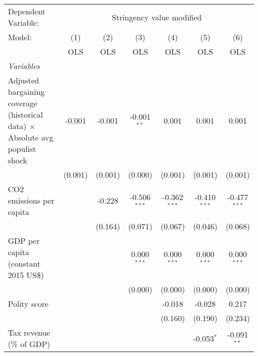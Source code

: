 
\begingroup
\centering
\begin{tabular}{lcccccc}
   \toprule
   Dependent Variable: & \multicolumn{6}{c}{Stringency value modified}\\
   Model:                                                                               & (1)     & (2)     & (3)            & (4)            & (5)            & (6)\\  
                                                                                        &  OLS    & OLS     & OLS            & OLS            & OLS            & OLS\\  
   \midrule
   \emph{Variables}\\
   Adjusted bargaining coverage (historical data) $\times$ Absolute avg populist shock  & -0.001  & -0.001  & -0.001$^{**}$  & 0.001          & 0.001          & 0.001\\   
                                                                                        & (0.001) & (0.001) & (0.000)        & (0.001)        & (0.001)        & (0.001)\\   
   CO2 emissions per capita                                                             &         & -0.228  & -0.506$^{***}$ & -0.362$^{***}$ & -0.410$^{***}$ & -0.477$^{***}$\\   
                                                                                        &         & (0.164) & (0.071)        & (0.067)        & (0.046)        & (0.068)\\   
   GDP per capita (constant 2015 US\$)                                                  &         &         & 0.000$^{***}$  & 0.000$^{***}$  & 0.000$^{***}$  & 0.000$^{***}$\\   
                                                                                        &         &         & (0.000)        & (0.000)        & (0.000)        & (0.000)\\   
   Polity score                                                                         &         &         &                & -0.018         & -0.028         & 0.217\\   
                                                                                        &         &         &                & (0.160)        & (0.190)        & (0.234)\\   
   Tax revenue (\% of GDP)                                                              &         &         &                &                & -0.053$^{*}$   & -0.091$^{**}$\\   

\end{tabular}
